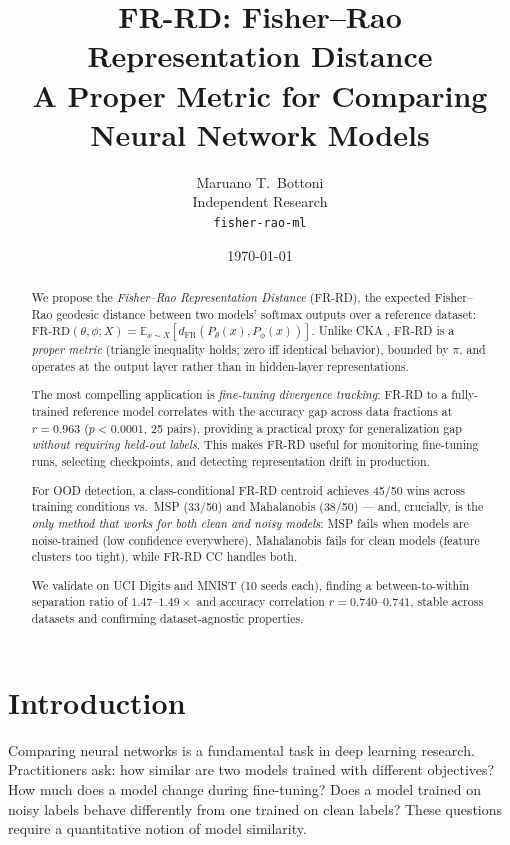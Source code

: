 \documentclass[11pt]{article}
\title{FR-RD: Fisher--Rao Representation Distance\\
A Proper Metric for Comparing Neural Network Models}
\author{
  Maruano T.\ Bottoni \\
  Independent Research \\
  \texttt{fisher-rao-ml}
}
\date{\today}
\begin{document}
\maketitle

\begin{abstract}
We propose the \emph{Fisher--Rao Representation Distance} (FR-RD), the expected
Fisher--Rao geodesic distance between two models' softmax outputs over a reference
dataset: $\mathrm{FR\text{-}RD}(\theta,\phi;X) = \mathbb{E}_{x\sim
X}[d_\mathrm{FR}(P_\theta(x), P_\phi(x))]$.
Unlike CKA \citep{kornblith2019similarity}, FR-RD is a \emph{proper metric}
(triangle inequality holds; zero iff identical behavior), bounded by $\pi$, and
operates at the output layer rather than in hidden-layer representations.

The most compelling application is \emph{fine-tuning divergence tracking}: FR-RD
to a fully-trained reference model correlates with the accuracy gap across data
fractions at $r=0.963$ ($p<0.0001$, 25 pairs), providing a practical proxy for
generalization gap \emph{without requiring held-out labels}. This makes FR-RD
useful for monitoring fine-tuning runs, selecting checkpoints, and detecting
representation drift in production.

For OOD detection, a class-conditional FR-RD centroid achieves 45/50 wins across
training conditions vs.\ MSP (33/50) and Mahalanobis (38/50) — and, crucially, is
the \emph{only method that works for both clean and noisy models}: MSP fails when
models are noise-trained (low confidence everywhere), Mahalanobis fails for clean
models (feature clusters too tight), while FR-RD CC handles both.

We validate on UCI Digits and MNIST (10 seeds each), finding a between-to-within
separation ratio of $1.47$--$1.49\times$ and accuracy correlation $r=0.740$--$0.741$,
stable across datasets and confirming dataset-agnostic properties.
\end{abstract}

\section{Introduction}

Comparing neural networks is a fundamental task in deep learning research. Practitioners
ask: how similar are two models trained with different objectives? How much does a model
change during fine-tuning? Does a model trained on noisy labels behave differently from one
trained on clean labels? These questions require a quantitative notion of model similarity.
\end{document}
